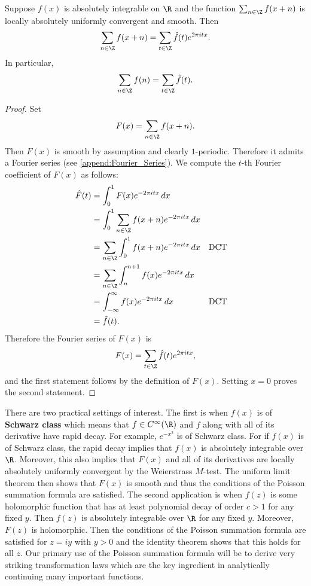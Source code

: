         \begin{theorem}
          Suppose $f(x)$ is absolutely integrable on $\R$ and the function $\sum_{n \in \Z}f(x+n)$ is locally absolutely uniformly convergent and smooth. Then
          \[
            \sum_{n \in \Z}f(x+n) = \sum_{t \in \Z}\hat{f}(t)e^{2\pi itx}.
          \]
          In particular,
          \[
            \sum_{n \in \Z}f(n) = \sum_{t \in \Z}\hat{f}(t).
          \]
        \end{theorem}
        \begin{proof}
          Set
          \[
            F(x) = \sum_{n \in \Z}f(x+n).
          \]
          Then $F(x)$ is smooth by assumption and clearly $1$-periodic. Therefore it admits a Fourier series (see \cref{append:Fourier_Series}). We compute the $t$-th Fourier coefficient of $F(x)$ as follows:
          \begin{align*}
            \hat{F}(t) &= \int_{0}^{1}F(x)e^{-2\pi itx}\,dx \\
            &= \int_{0}^{1}\sum_{n \in \Z}f(x+n)e^{-2\pi itx}\,dx \\
            &= \sum_{n \in \Z}\int_{0}^{1}f(x+n)e^{-2\pi itx}\,dx && \text{DCT} \\
            &= \sum_{n \in \Z}\int_{n}^{n+1}f(x)e^{-2\pi itx}\,dx \\
            &= \int_{-\infty}^{\infty}f(x)e^{-2\pi itx}\,dx && \text{DCT} \\
            &= \hat{f}(t).
          \end{align*}
          Therefore the Fourier series of $F(x)$ is
          \[
            F(x) = \sum_{t \in \Z}\hat{f}(t)e^{2\pi itx},
          \]
          and the first statement follows by the definition of $F(x)$. Setting $x = 0$ proves the second statement.
        \end{proof}

        There are two practical settings of interest. The first is when $f(x)$ is of \textbf{Schwarz class} which means that $f \in C^{\infty}(\R)$ and $f$ along with all of its derivative have rapid decay. For example, $e^{-x^{2}}$ is of Schwarz class. For if $f(x)$ is of Schwarz class, the rapid decay implies that $f(x)$ is absolutely integrable over $\R$. Moreover, this also implies that $F(x)$ and all of its derivatives are locally absolutely uniformly convergent by the Weierstrass $M$-test. The uniform limit theorem then shows that $F(x)$ is smooth and thus the conditions of the Poisson summation formula are satisfied. The second application is when $f(z)$ is some holomorphic function that has at least polynomial decay of order $c > 1$ for any fixed $y$. Then $f(z)$ is absolutely integrable over $\R$ for any fixed $y$. Moreover, $F(z)$ is holomorphic. Then the conditions of the Poisson summation formula are satisfied for $z = iy$ with $y > 0$ and the identity theorem shows that this holds for all $z$. Our primary use of the Poisson summation formula will be to derive very striking transformation laws which are the key ingredient in analytically continuing many important functions.
